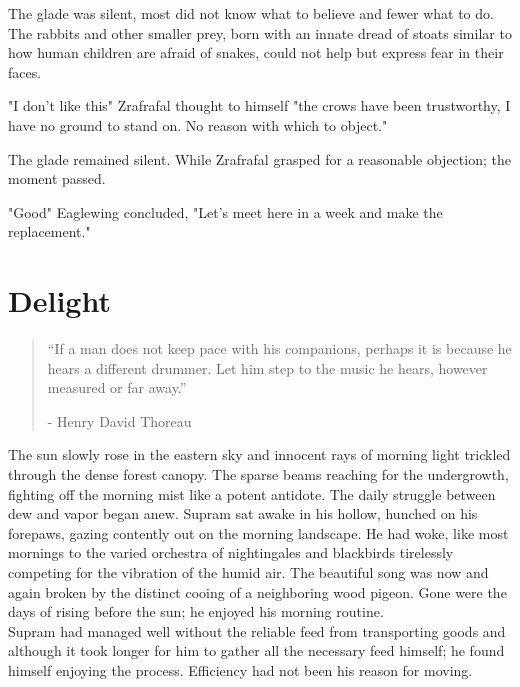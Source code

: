 \documentclass[smalldemyvopaper,11pt,twoside,onecolumn,openright,extrafontsizes]{memoir}
\begin{document}
The glade was silent, most did not know what to believe and fewer what to do. The rabbits and other smaller prey, born with an innate dread of stoats similar to how human children are afraid of snakes, could not help but express fear in their faces. 

"I don't like this" Zrafrafal thought to himself "the crows have been trustworthy, I have no ground to stand on. No reason with which to object." 

The glade remained silent. While Zrafrafal grasped for a reasonable objection; the moment passed.

"Good" Eaglewing concluded, "Let's meet here in a week and make the replacement."


\chapter{Delight}

\vspace{-1.3cm}
\begin{localsize}{10}
	\begin{quote}
		“If a man does not keep pace with his companions, perhaps it is because he hears a different drummer. Let him step to the music he hears, however measured or far away.”
		\begin{flushright}- Henry David Thoreau \end{flushright}
	\end{quote} 
\end{localsize}
\vspace{1cm}

The sun slowly rose in the eastern sky and innocent rays of morning light trickled through the dense forest canopy. The sparse beams reaching for the undergrowth, fighting off the morning mist like a potent antidote. The daily struggle between dew and vapor began anew. Supram sat awake in his hollow, hunched on his forepaws, gazing contently out on the morning landscape. He had woke, like most mornings to the varied orchestra of nightingales and blackbirds tirelessly competing for the vibration of the humid air. The beautiful song was now and again broken by the distinct cooing of a neighboring wood pigeon. Gone were the days of rising before the sun; he enjoyed his morning routine.\\

Supram had managed well without the reliable feed from transporting goods and although it took longer for him to gather all the necessary feed himself; he found himself enjoying the process. Efficiency had not been his reason for moving.\\
\end{document}
